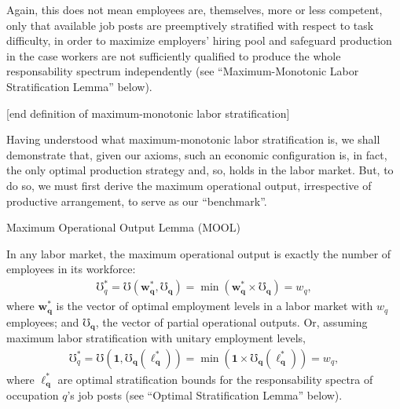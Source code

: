 \documentclass[hidelinks, nonatbib]{elsarticle}
\begin{document}
\begin{enumerate}
Again, this does not mean employees are, themselves, more or less competent, only that available job posts are preemptively stratified with respect to task difficulty, in order to maximize employers' hiring pool and safeguard production in the case workers are not sufficiently qualified to produce the whole responsability spectrum independently (see ``Maximum-Monotonic Labor Stratification Lemma'' below).

[end definition of maximum-monotonic labor stratification]

Having understood what maximum-monotonic labor stratification is, we shall demonstrate that, given our axioms, such an economic configuration is, in fact, the only optimal production strategy and, so, holds in the labor market. But, to do so, we must first derive the maximum operational output, irrespective of productive arrangement, to serve as our ``benchmark''.

Maximum Operational Output Lemma (MOOL)

    In any labor market, the maximum operational output is exactly the number of employees in its workforce:
    \begin{gather}
        \mho_{q}^{*}
        =
        \mho(
            \boldsymbol{w_{q}^{*}},
            \boldsymbol{\mho_q}
        ) = 
        \min(
            \boldsymbol{w_{q}^{*}}
            \times
            \boldsymbol{\mho_q}
        )
        = w_q
        ,
    \end{gather}
    where $\boldsymbol{w_{q}^{*}}$ is the vector of optimal employment levels in a labor market with $w_q$ employees; and $\boldsymbol{\mho_q}$, the vector of partial operational outputs. Or, assuming maximum labor stratification with unitary employment levels,
    \begin{gather}
        \mho_{q}^{*}
        =
        \mho(
            \boldsymbol{1},
            \boldsymbol{\mho_q}(
                \boldsymbol{\ell_{q}^{*}}
            )
        )
        =
        \min(
            \boldsymbol{1}
            \times
            \boldsymbol{\mho_q}(
                \boldsymbol{\ell_{q}^{*}}
            )
        )
        = w_q
        ,
    \end{gather}
    where $\boldsymbol{\ell_{q}^{*}}$ are optimal stratification bounds for the responsability spectra of occupation $q$'s job posts (see ``Optimal Stratification Lemma'' below).
    

\end{enumerate}
\end{document}
